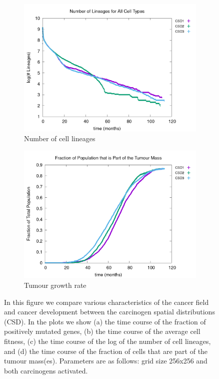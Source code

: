 \documentclass[\main/thesis.tex]{subfiles}
\begin{document}
\begin{figure}[H]
\begin{subfigure}[t]{.49\textwidth}
      \centering
      \includegraphics[width=\textwidth]{images/4_CarcinFunc/Fig5/numLineages_CarcinFuncs.png}
      \caption{Number of cell lineages}
      \label{fig:CarcinFunc_numLineages}
    \end{subfigure}
    \begin{subfigure}[t]{.49\textwidth}
      \centering
      \includegraphics[width=\textwidth]{images/4_CarcinFunc/Fig5/numCSCAndTC_CarcinFuncs.png}
      \caption{Tumour growth rate}
      \label{fig:CarcinFunc_TumourMassGrowthCurve}
    \end{subfigure}
    \caption{In this figure we compare various characteristics of the cancer field and cancer development between the carcinogen spatial distributions (CSD). In the plots we show (a) the time course of the fraction of positively mutated genes, (b) the time course of the average cell fitness, (c) the time course of the log of the number of cell lineages, and (d) the time course of the fraction of cells that are part of the tumour mass(es). Parameters are as follows: grid size 256x256 and both carcinogens activated.}
    \label{fig:CarcinFunc_Characteristics}
\end{figure}
\end{document}
